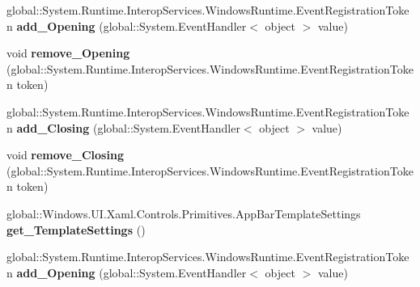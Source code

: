 \begin{DoxyCompactItemize}
\item 
\mbox{\label{interface_windows_1_1_u_i_1_1_xaml_1_1_controls_1_1_i_app_bar3_a62cddde1b89907b6b31a54a5172b02d5}} 
global\+::\+System.\+Runtime.\+Interop\+Services.\+Windows\+Runtime.\+Event\+Registration\+Token {\bfseries add\+\_\+\+Opening} (global\+::\+System.\+Event\+Handler$<$ object $>$ value)
\item 
\mbox{\label{interface_windows_1_1_u_i_1_1_xaml_1_1_controls_1_1_i_app_bar3_afaabe37e022a635508e675aa7ef0974c}} 
void {\bfseries remove\+\_\+\+Opening} (global\+::\+System.\+Runtime.\+Interop\+Services.\+Windows\+Runtime.\+Event\+Registration\+Token token)
\item 
\mbox{\label{interface_windows_1_1_u_i_1_1_xaml_1_1_controls_1_1_i_app_bar3_a6e424fac8c7cec71bad623c7c5e8ebd3}} 
global\+::\+System.\+Runtime.\+Interop\+Services.\+Windows\+Runtime.\+Event\+Registration\+Token {\bfseries add\+\_\+\+Closing} (global\+::\+System.\+Event\+Handler$<$ object $>$ value)
\item 
\mbox{\label{interface_windows_1_1_u_i_1_1_xaml_1_1_controls_1_1_i_app_bar3_aac12730dbba64fc7499059fd3646d24d}} 
void {\bfseries remove\+\_\+\+Closing} (global\+::\+System.\+Runtime.\+Interop\+Services.\+Windows\+Runtime.\+Event\+Registration\+Token token)
\item 
\mbox{\label{interface_windows_1_1_u_i_1_1_xaml_1_1_controls_1_1_i_app_bar3_a890144dceae211eb8ad8f8f7a8bea0d8}} 
global\+::\+Windows.\+U\+I.\+Xaml.\+Controls.\+Primitives.\+App\+Bar\+Template\+Settings {\bfseries get\+\_\+\+Template\+Settings} ()
\item 
\mbox{\label{interface_windows_1_1_u_i_1_1_xaml_1_1_controls_1_1_i_app_bar3_a62cddde1b89907b6b31a54a5172b02d5}} 
global\+::\+System.\+Runtime.\+Interop\+Services.\+Windows\+Runtime.\+Event\+Registration\+Token {\bfseries add\+\_\+\+Opening} (global\+::\+System.\+Event\+Handler$<$ object $>$ value)

\end{DoxyCompactItemize}

